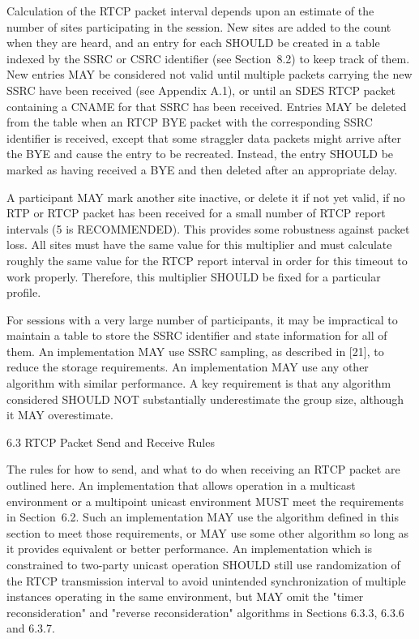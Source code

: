 \documentclass{article}
\begin{document}
Calculation of the RTCP packet interval depends upon an estimate of the number of sites participating in the session.  New sites are added to the count when they are heard, and an entry for each SHOULD be created in a table indexed by the SSRC or CSRC identifier (see Section~8.2) to keep track of them.  New entries MAY be considered not valid until multiple packets carrying the new SSRC have been received (see Appendix A.1), or until an SDES RTCP packet containing a CNAME for that SSRC has been received.  Entries MAY be deleted from the table when an RTCP BYE packet with the corresponding SSRC identifier is received, except that some straggler data packets might arrive after the BYE and cause the entry to be recreated.  Instead, the entry SHOULD be marked as having received a BYE and then deleted after an appropriate delay.

A participant MAY mark another site inactive, or delete it if not yet valid, if no RTP or RTCP packet has been received for a small number of RTCP report intervals (5 is RECOMMENDED).  This provides some robustness against packet loss.  All sites must have the same value for this multiplier and must calculate roughly the same value for the RTCP report interval in order for this timeout to work properly. Therefore, this multiplier SHOULD be fixed for a particular profile.

For sessions with a very large number of participants, it may be impractical to maintain a table to store the SSRC identifier and state information for all of them.  An implementation MAY use SSRC sampling, as described in [21], to reduce the storage requirements. An implementation MAY use any other algorithm with similar performance.  A key requirement is that any algorithm considered SHOULD NOT substantially underestimate the group size, although it MAY overestimate.

6.3 RTCP Packet Send and Receive Rules

The rules for how to send, and what to do when receiving an RTCP packet are outlined here.  An implementation that allows operation in a multicast environment or a multipoint unicast environment MUST meet the requirements in Section~6.2.  Such an implementation MAY use the algorithm defined in this section to meet those requirements, or MAY use some other algorithm so long as it provides equivalent or better performance.  An implementation which is constrained to two-party unicast operation SHOULD still use randomization of the RTCP transmission interval to avoid unintended synchronization of multiple instances operating in the same environment, but MAY omit the "timer reconsideration" and "reverse reconsideration" algorithms in Sections 6.3.3, 6.3.6 and 6.3.7.
\end{document}
